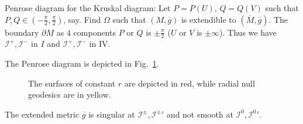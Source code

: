 Penrose diagram for the Kruskal diagram: 
Let $P = P(U)$, $Q  = Q(V)$ such that $P, Q \in (-\frac{\pi}{2}, \frac{\pi}{2})$, say.
Find $\Omega$ such that $(M, \overline{g}{})$ is extendible to $(\overline{M}{}, \overline{g}{})$. The boundary $\partial M$ as $4$ components $P$ or $Q$ is $\pm \frac{\pi}{2}$ ($U$ or $V$ is $\pm \infty$).
Thus we have $\mathscr{I}^+, \mathscr{I}^-$ in $I$ and $\mathscr{I}^+, \mathscr{I}^-$ in IV.

The Penrose diagram is depicted in Fig.~\ref{fig:l11f5}.
\begin{figure}[tbhp]
  \centering
  \def\svgwidth{0.9\columnwidth}
  
  \caption{The surfaces of constant $r$ are depicted in red, while radial null geodesics are in yellow.}
  \label{fig:l11f5}
\end{figure}

The extended metric $\overline{g}{}$ is singular at $\mathscr{I}^{\pm}, \mathscr{I}^{\pm}{}'$ and not smooth at $\mathscr{I}^0, \mathscr{I}^0{}'$.
